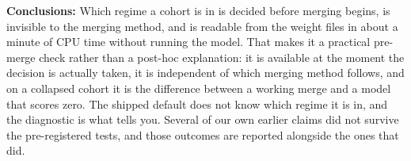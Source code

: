 {\bf Conclusions:}
Which regime a cohort is in is decided before merging begins, is invisible to
the merging method, and is readable from the weight files in about a minute of
CPU time without running the model. That makes it a practical pre-merge check
rather than a post-hoc explanation: it is available at the moment the decision
is actually taken, it is independent of which merging method follows, and on a
collapsed cohort it is the difference between a working merge and a model that
scores zero. The shipped default does not know which regime it is in, and the
diagnostic is what tells you. Several of our own earlier claims did not survive
the pre-registered tests, and those outcomes are reported alongside the ones that
did.
